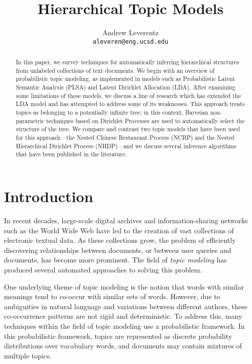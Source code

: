\documentclass{article}
\title{Hierarchical Topic Models}
\author{
  Andrew Leverentz \\
  \texttt{aleveren@eng.ucsd.edu} \\
}
\begin{document}
\maketitle

\begin{abstract}
In this paper, we survey techniques for automatically inferring hierarchical structures from unlabeled collections of text documents.
We begin with an overview of probabilistic topic modeling, as implemented in models such as Probabilistic Latent Semantic Analysis (PLSA) and Latent Dirichlet Allocation (LDA).
After examining some limitations of these models, we discuss a line of research which has extended the LDA model and has attempted to address some of its weaknesses.
This approach treats topics as belonging to a potentially infinite tree; in this context, Bayesian non-parametric techniques based on Dirichlet Processes are used to automatically select the structure of the tree.
We compare and contrast two topic models that have been used for this approach---the Nested Chinese Restaurant Process (NCRP) and the Nested Hierarchical Dirichlet Process (NHDP)---and we discuss several inference algorithms that have been published in the literature.
\end{abstract}

\section{Introduction}

In recent decades, large-scale digital archives and information-sharing networks such as the World Wide Web have led to the creation of vast collections of electronic textual data.
As these collections grow, the problem of efficiently discovering relationships between documents, or between  user queries and documents, has become more prominent.
The field of \emph{topic modeling} has produced several automated approaches to solving this problem.

One underlying theme of topic modeling is the notion that words with similar meanings tend to co-occur with similar sets of words.
However, due to ambiguities in natural language and variations between different authors, these co-occurrence patterns are not rigid and deterministic.
To address this, many techniques within the field of topic modeling use a probabilistic framework.
In this probabilistic framework, topics are represented as discrete probability distributions over vocabulary words, and documents may contain mixtures of multiple topics.
\end{document}
